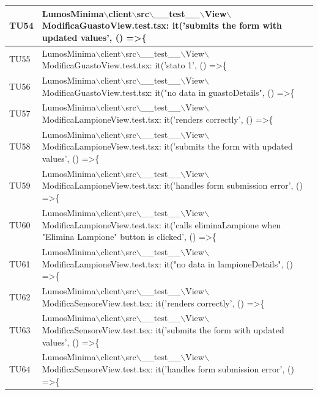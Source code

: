 \documentclass[12pt]{article}
\begin{document}
\begin{scriptsize}
\begin{xltabular}{\linewidth}{|>{\hsize}X|X|}
	TU54 & LumosMinima$\backslash$client$\backslash$src$\backslash$\_\_test\_\_$\backslash$View$\backslash$ModificaGuastoView.test.tsx: it('submits the form with updated values', () =\textgreater \{ \\ \hline
	TU55 & LumosMinima$\backslash$client$\backslash$src$\backslash$\_\_test\_\_$\backslash$View$\backslash$ModificaGuastoView.test.tsx: it('stato 1', () =\textgreater \{ \\ \hline
	TU56 & LumosMinima$\backslash$client$\backslash$src$\backslash$\_\_test\_\_$\backslash$View$\backslash$ModificaGuastoView.test.tsx: it("no data in guastoDetails", () =\textgreater \{ \\ \hline
	TU57 & LumosMinima$\backslash$client$\backslash$src$\backslash$\_\_test\_\_$\backslash$View$\backslash$ModificaLampioneView.test.tsx: it('renders correctly', () =\textgreater \{ \\ \hline
	TU58 & LumosMinima$\backslash$client$\backslash$src$\backslash$\_\_test\_\_$\backslash$View$\backslash$ModificaLampioneView.test.tsx: it('submits the form with updated values', () =\textgreater \{ \\ \hline
	TU59 & LumosMinima$\backslash$client$\backslash$src$\backslash$\_\_test\_\_$\backslash$View$\backslash$ModificaLampioneView.test.tsx: it('handles form submission error', () =\textgreater \{ \\ \hline
	TU60 & LumosMinima$\backslash$client$\backslash$src$\backslash$\_\_test\_\_$\backslash$View$\backslash$ModificaLampioneView.test.tsx: it('calls eliminaLampione when "Elimina Lampione" button is clicked', () =\textgreater \{ \\ \hline
	TU61 & LumosMinima$\backslash$client$\backslash$src$\backslash$\_\_test\_\_$\backslash$View$\backslash$ModificaLampioneView.test.tsx: it("no data in lampioneDetails", () =\textgreater \{ \\ \hline
	TU62 & LumosMinima$\backslash$client$\backslash$src$\backslash$\_\_test\_\_$\backslash$View$\backslash$ModificaSensoreView.test.tsx: it('renders correctly', () =\textgreater \{ \\ \hline
	TU63 & LumosMinima$\backslash$client$\backslash$src$\backslash$\_\_test\_\_$\backslash$View$\backslash$ModificaSensoreView.test.tsx: it('submits the form with updated values', () =\textgreater \{ \\ \hline
	TU64 & LumosMinima$\backslash$client$\backslash$src$\backslash$\_\_test\_\_$\backslash$View$\backslash$ModificaSensoreView.test.tsx: it('handles form submission error', () =\textgreater \{ \\ \hline

\end{xltabular}
\end{scriptsize}
\end{document}
